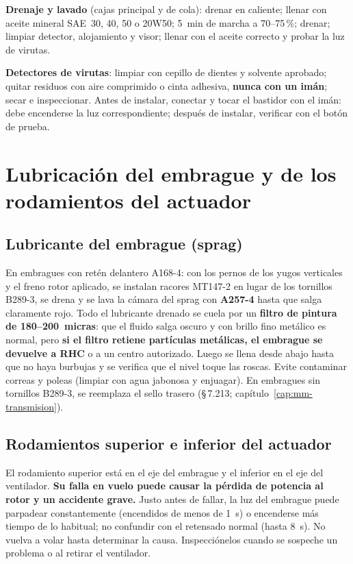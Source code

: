 \textbf{Drenaje y lavado} (cajas principal y de cola): drenar en caliente; llenar con aceite mineral SAE~30, 40, 50 o 20W50; 5~min de marcha a 70--75\,\%; drenar; limpiar detector, alojamiento y visor; llenar con el aceite correcto y probar la luz de virutas.

\textbf{Detectores de virutas}: limpiar con cepillo de dientes y solvente aprobado; quitar residuos con aire comprimido o cinta adhesiva, \textbf{nunca con un imán}; secar e inspeccionar. Antes de instalar, conectar y tocar el bastidor con el imán: debe encenderse la luz correspondiente; después de instalar, verificar con el botón de prueba.

\section{Lubricación del embrague y de los rodamientos del actuador}

\subsection{Lubricante del embrague (sprag)}

En embragues con retén delantero A168-4: con los pernos de los yugos verticales y el freno rotor aplicado, se instalan racores MT147-2 en lugar de los tornillos B289-3, se drena y se lava la cámara del sprag con \textbf{A257-4} hasta que salga claramente rojo. Todo el lubricante drenado se cuela por un \textbf{filtro de pintura de 180--200~micras}: que el fluido salga oscuro y con brillo fino metálico es normal, pero \textbf{si el filtro retiene partículas metálicas, el embrague se devuelve a RHC} o a un centro autorizado. Luego se llena desde abajo hasta que no haya burbujas y se verifica que el nivel toque las roscas. Evite contaminar correas y poleas (limpiar con agua jabonosa y enjuagar). En embragues sin tornillos B289-3, se reemplaza el sello trasero (\S\,7.213; capítulo~\ref{cap:mm-transmision}).

\subsection{Rodamientos superior e inferior del actuador}

El rodamiento superior está en el eje del embrague y el inferior en el eje del ventilador. \textbf{Su falla en vuelo puede causar la pérdida de potencia al rotor y un accidente grave.} Justo antes de fallar, la luz del embrague puede parpadear constantemente (encendidos de menos de 1~s) o encenderse más tiempo de lo habitual; no confundir con el retensado normal (hasta 8~s). No vuelva a volar hasta determinar la causa. Inspecciónelos cuando se sospeche un problema o al retirar el ventilador.

